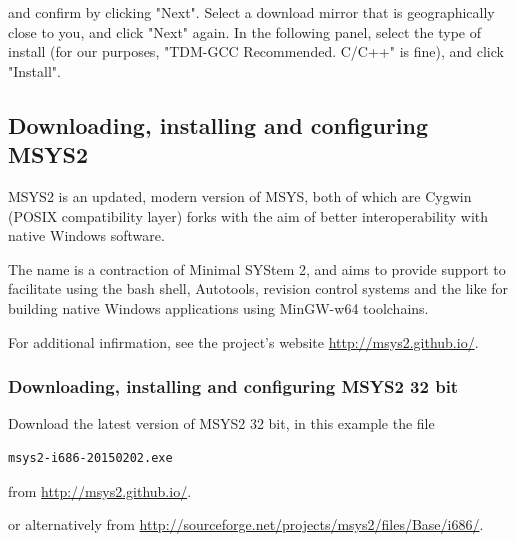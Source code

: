 and confirm by clicking "Next". Select a download mirror that is geographically close to you, and click "Next" again. In the following panel, select the type of install (for our purposes, "TDM-GCC Recommended. C/C++" is fine), and click "Install".



\subsection{Downloading, installing and configuring MSYS2}
MSYS2 is an updated, modern version of MSYS, both of which are Cygwin (POSIX compatibility layer) forks with the aim of better interoperability with native Windows software.

The name is a contraction of Minimal SYStem 2, and aims to provide support to facilitate using the bash shell, Autotools, revision control systems and the like for building native Windows applications using MinGW-w64 toolchains.

For additional infirmation, see the project's website \href{http://msys2.github.io/}{http://msys2.github.io/}.


\subsubsection{Downloading, installing and configuring MSYS2 32 bit}

Download the latest version of MSYS2 32 bit, in this example the file
\begin{verbatim}
msys2-i686-20150202.exe
\end{verbatim}
from \href{http://msys2.github.io/}{http://msys2.github.io/}.

or alternatively from \href{http://sourceforge.net/projects/msys2/files/Base/i686/}{http://sourceforge.net/projects/msys2/files/Base/i686/}.

